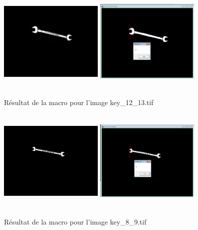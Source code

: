 \documentclass{scrreprt}
\begin{document}
\begin{figure}[!h]
\centering
\includegraphics[width=5cm, height=5cm]{images/key1213.png}\hfill
\includegraphics[width=5cm, height=5cm]{images/key13.png}
\caption{Résultat de la macro pour l'image key_12_13.tif}
\end{figure}

\begin{figure}[!h]
\centering
\includegraphics[width=5cm, height=5cm]{images/key89.png}\hfill
\includegraphics[width=5cm, height=5cm]{images/key8.png}
\caption{Résultat de la macro pour l'image key_8_9.tif}
\end{figure}
\end{document}
